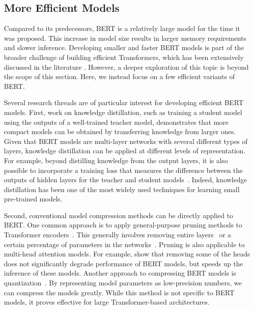 \subsection{More Efficient Models}

\noindent Compared to its predecessors, BERT is a relatively large model for the time it was proposed. This increase in model size results in larger memory requirements and slower inference. Developing smaller and faster BERT models is part of the broader challenge of building efficient Transformers, which has been extensively discussed in the literature \cite{Tay-etal:2020efficient,xiao-and-zhu:2023introduction}. However, a deeper exploration of this topic is beyond the scope of this section. Here, we instead focus on a few efficient variants of BERT.

Several research threads are of particular interest for developing efficient BERT models. First, work on knowledge distillation, such as training a student model using the outputs of a well-trained teacher model, demonstrates that more compact models can be obtained by transferring knowledge from larger ones. Given that BERT models are multi-layer networks with several different types of layers, knowledge distillation can be applied at different levels of representation. For example, beyond distilling knowledge from the output layers, it is also possible to incorporate a training loss that measures the difference between the outputs of hidden layers for the teacher and student models~\cite{sun2020-etal:mobilebert,jiao-etal:2020tinybert}. Indeed, knowledge distillation has been one of the most widely used techniques for learning small pre-trained models.

Second, conventional model compression methods can be directly applied to BERT. One common approach is to apply general-purpose pruning methods to Transformer encoders~\cite{gale-etal:2019state}. This generally involves removing entire layers~\cite{fan-etal:2019reducing} or a certain percentage of parameters in the networks~\cite{sanh-etal:2020movement,chen-etal:2020lottery}. Pruning is also applicable to multi-head attention models. For example, \citet{michel-etal:2019sixteen} show that removing some of the heads does not significantly degrade performance of BERT models, but speeds up the inference of these models. Another approach to compressing BERT models is quantization~\cite{shen-etal:2020qbert}. By representing model parameters as low-precision numbers, we can compress the models greatly. While this method is not specific to BERT models, it proves effective for large Transformer-based architectures.

